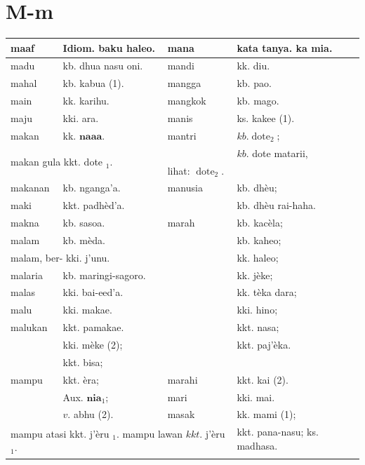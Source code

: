 \documentclass[10pt]{article}
\begin{document}
\section*{M-m}
\begin{center}
\begin{tabular}{|l|l|l|l|}
\hline
maaf & Idiom. baku haleo. & mana & kata tanya. ka mia. \\
\hline
madu & kb. dhua nasu oni. & mandi & kk. diu. \\
\hline
mahal & kb. kabua (1). & mangga & kb. pao. \\
\hline
main & kk. karihu. & mangkok & kb. mago. \\
\hline
maju & kki. ara. & manis & ks. kakee (1). \\
\hline
makan & kk. \(\mathbf{n} \boldsymbol{a} \boldsymbol{a} \boldsymbol{a}\). & mantri & \(k b . \operatorname{dote}_{2}\); \\
\hline
\multicolumn{2}{|l|}{\multirow[t]{2}{*}{makan gula kkt. dote \({ }_{1}\).}} &  & \(k b\). dote matarii, \\
\hline
\multicolumn{3}{|l|}{makan, memberi kkt. panga'a.} & lihat: \(\operatorname{dote}_{2}\). \\
\hline
makanan & kb. nganga'a. & manusia & kb. dhèu; \\
\hline
maki & kkt. padhèd'a. &  & kb. dhèu rai-haha. \\
\hline
makna & kb. sasoa. & marah & kb. kacèla; \\
\hline
malam & kb. mèda. &  & kb. kaheo; \\
\hline
\multicolumn{2}{|l|}{malam, ber- kki. j'unu.} &  & kk. haleo; \\
\hline
malaria & kb. maringi-sagoro. &  & kk. jèke; \\
\hline
malas & kki. bai-eed'a. &  & kk. tèka dara; \\
\hline
malu & kki. makae. &  & kki. hino; \\
\hline
malukan & kkt. pamakae. &  & kkt. nasa; \\
\hline
\multirow[t]{5}{*}{mampu} & kki. mèke (2); &  & kkt. paj'èka. \\
\hline
 & kkt. bisa; & \multicolumn{2}{|c|}{} \\
\hline
 & kkt. èra; & marahi & kkt. kai (2). \\
\hline
 & Aux. \(\mathbf{n} \mathbf{i} \mathbf{a}_{1}\); & mari & kki. mai. \\
\hline
 & \(v\). abhu (2). & masak & kk. mami (1); \\
\hline
\multicolumn{3}{|l|}{\multirow{2}{*}{mampu atasi kkt. j'èru \({ }_{1}\). mampu lawan \(k k t\). j'èru \({ }_{1}\).}} & kkt. pana-nasu; ks. madhasa. \\
\hline
 &  &  &  \\
\hline
\end{tabular}
\end{center}
\end{document}
